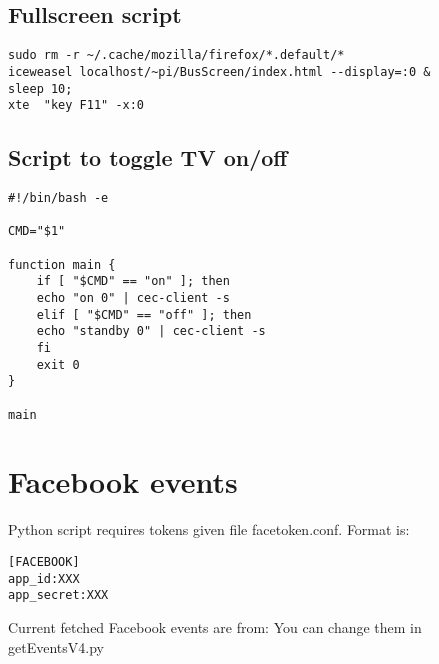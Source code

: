 \documentclass{article}
\begin{document}
\subsection{Fullscreen script}
\begin{verbatim}
sudo rm -r ~/.cache/mozilla/firefox/*.default/*
iceweasel localhost/~pi/BusScreen/index.html --display=:0 &
sleep 10;
xte  "key F11" -x:0
\end{verbatim}
\subsection{Script to toggle TV on/off}
\begin{verbatim}
#!/bin/bash -e

CMD="$1"

function main {
    if [ "$CMD" == "on" ]; then
	echo "on 0" | cec-client -s 
    elif [ "$CMD" == "off" ]; then
	echo "standby 0" | cec-client -s
    fi
    exit 0
}

main
\end{verbatim}
\section{Facebook events}
Python script requires tokens given file facetoken.conf. Format is:
\begin{verbatim}
[FACEBOOK]
app_id:XXX
app_secret:XXX
\end{verbatim}
Current fetched Facebook events are from: 
You can change them in getEventsV4.py
\end{document}

